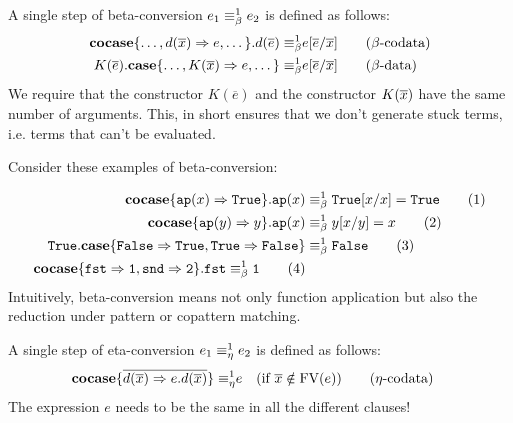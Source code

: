 \documentclass[twoside,12pt,a4paper]{article}
\begin{document}
\begin{definition} \label{sec:betaconv}
    A single step of beta-conversion $e_1 \equiv_{\beta}^1 e_2$ is defined as follows:
    \begin{align*}
        \textbf{cocase}\{\dots,d(\overline{x}) \Rightarrow e, \dots\}.d(\overline{e})
        \equiv_{\beta}^1 & e[\overline{e}/\overline{x}]  
        \tag{$\beta$-codata}\\
        K(\overline{e}).\textbf{case}\{\dots,K(\overline{x})\Rightarrow e,\dots\}
        \equiv_{\beta}^1 & e[\overline{e}/\overline{x}] 
        \tag{$\beta$-data}
    \end{align*}
    We require that the constructor $K(\overline{e})$ and the constructor $K(\overline{x})$ have the same number of arguments.
    This, in short ensures that we don't generate stuck terms, i.e. terms that can't be evaluated.
\end{definition}
Consider these examples of beta-conversion:
\begin{example}
    \begin{align*}
        \textbf{cocase}\{\texttt{ap}(x)\Rightarrow \mathtt{True}\}.\texttt{ap}(x)&\equiv_{\beta}^1 \mathtt{True}[x/x] = \mathtt{True} 
        \tag{1}\\
        \textbf{cocase}\{\texttt{ap}(y)\Rightarrow y\}.\texttt{ap}(x) &\equiv_{\beta}^1 y[x/y]= x
        \tag{2}\\
        \mathtt{True}.\textbf{case}\{\mathtt{False}\Rightarrow \mathtt{True}, \mathtt{True} \Rightarrow \mathtt{False}\}&\equiv_{\beta}^1\mathtt{False}
        \tag{3}\\
        \textbf{cocase}\{\mathtt{fst\Rightarrow 1, snd\Rightarrow 2}\}.\mathtt{fst}\equiv_{\beta}^1 \mathtt{1}
        \tag{4}
    \end{align*}
    Intuitively, beta-conversion means not only function application but also the reduction under pattern or copattern matching. %
\end{example}

\begin{definition}
    A single step of eta-conversion $e_1 \equiv_{\eta}^1 e_2$ is defined as follows:
    \begin{align*}
        \textbf{cocase}\{\overline{d(\overline{x})\Rightarrow e.d(\overline{x})}\}
        \equiv_{\eta}^1 & e \quad (\text{if } \overline{x}\notin \text{FV}(e)) \tag{$\eta$-codata}
    \end{align*}
    The expression $e$ needs to be the same in all the different clauses!
\end{definition}
\end{document}
